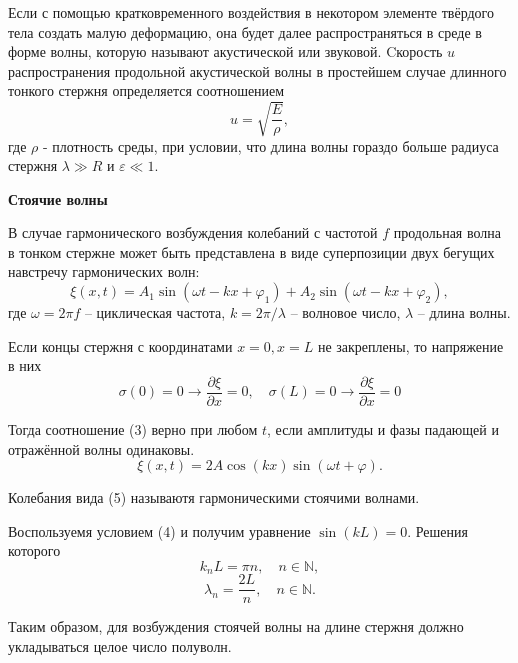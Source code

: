 \documentclass[a4paper,12 pt]{article}
\begin{document}
Если с помощью кратковременного воздействия в некотором элементе
твёрдого тела создать малую деформацию, она будет далее распространяться в среде в форме волны, которую называют акустической или звуковой.
Cкорость $u$ распространения продольной акустической волны в простейшем случае длинного тонкого стержня определяется соотношением
\begin{equation}
    u = \sqrt{\frac{E}{\rho}},
\end{equation}
где $\rho$ - плотность среды, при условии, что длина волны гораздо больше радиуса стержня $\lambda \gg R$ и $\varepsilon \ll 1$.

\textbf{Стоячие волны}

В случае гармонического возбуждения колебаний с частотой $f$ продольная волна в тонком стержне может быть представлена в виде суперпозиции
двух бегущих навстречу гармонических волн:
\begin{equation}
    \xi (x,t) = A_1 \sin(\omega t -kx +\varphi_1) + A_2 \sin(\omega t -kx +\varphi_2),
\end{equation}
где $\omega = 2 \pi f$ -- циклическая частота, $k = 2 \pi / \lambda$ -- волновое число, $ \lambda$ -- длина волны.

Если концы стержня с координатами $x=0, x=L$ не закреплены, то напряжение в них
\begin{equation}
    \sigma(0) = 0 \rightarrow \frac{\partial \xi}{\partial x} =0, \quad \sigma(L) = 0 \rightarrow \frac{\partial \xi}{\partial x} =0
\end{equation}

Тогда соотношение (3) верно при любом $t$, если амплитуды и фазы падающей и отражённой волны одинаковы.
\begin{equation}
    \xi (x,t) = 2A \cos(kx) \sin(\omega t +\varphi).
\end{equation}

Колебания вида (5) называютя гармоническими стоячими волнами. 

Воспользуемя условием (4) и получим уравнение $\sin (kL) = 0$. Решения которого
\begin{equation}
    k_n L = \pi n, \quad n \in \mathbb{N},
\end{equation}
\begin{equation}
    \lambda_n = \frac{2L}{n}, \quad n \in \mathbb{N}.
\end{equation}

Таким образом, для возбуждения стоячей волны на длине стержня должно
укладываться целое число полуволн.
\end{document}
